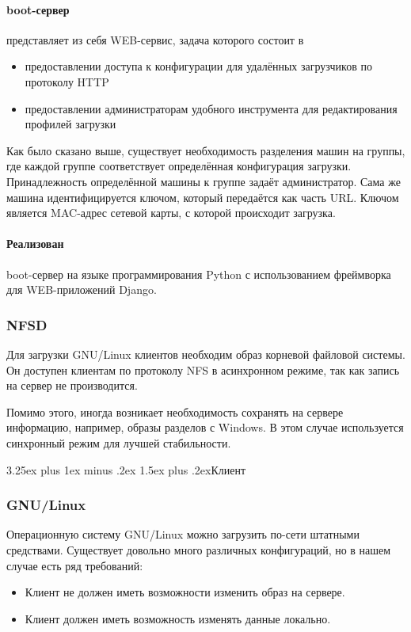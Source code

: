 \documentclass[11pt]{article}
\makeatletter
\renewcommand{\subsection}{\@startsection{subsection}{2}%
{\parindent}{3.25ex plus 1ex minus .2ex}%
{1.5ex plus .2ex}{\bfseries}}
\makeatother
\begin{document}
\paragraph{boot-сервер} представляет из себя WEB-сервис, задача которого состоит в
\begin{itemize}
    \item предоставлении доступа к конфигурации для удалённых загрузчиков по протоколу HTTP
    \item предоставлении администраторам удобного инструмента для редактирования профилей загрузки
\end{itemize}

Как было сказано выше, существует необходимость разделения машин на группы,
где каждой группе соответствует определённая конфигурация загрузки. Принадлежность
определённой машины к группе задаёт администратор. Сама же машина идентифицируется ключом,
который передаётся как часть URL. Ключом является MAC-адрес сетевой карты, с которой
происходит загрузка.

\paragraph{Реализован} boot-сервер на языке программирования Python
с использованием фреймворка для WEB-приложений Django.

\subsubsection{NFSD}
Для загрузки GNU/Linux клиентов необходим образ
корневой файловой системы. Он доступен клиентам
по протоколу NFS в асинхронном режиме, так как
запись на сервер не производится.

Помимо этого, иногда возникает необходимость
сохранять на сервере информацию, например, образы
разделов с Windows. В этом случае используется
синхронный режим для лучшей стабильности.

\subsection{Клиент}

\subsubsection{GNU/Linux}
Операционную систему GNU/Linux можно загрузить по-сети
штатными средствами. Существует довольно много различных
конфигураций, но в нашем случае есть ряд требований:
\begin{itemize}
    \item Клиент не должен иметь возможности изменить образ на сервере.
    \item Клиент должен иметь возможность изменять данные локально.
\end{itemize}
\end{document}
